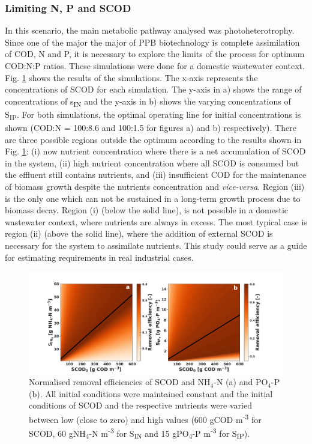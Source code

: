 \subsubsection{Limiting N, P and SCOD}
In this scenario, the main metabolic pathway analysed was photoheterotrophy. Since one of the major the major of PPB biotechnology is complete assimilation of COD, N and P, it is necessary to explore the limits of the process for optimum COD:N:P ratios. These simulations were done for a domestic wastewater context.
\skippingparagraph
Fig. \ref{fig:ch2_cnp} shows the results of the simulations. The x-axis represents the concentrations of SCOD for each simulation. The y-axis in a) shows the range of concentrations of s\textsubscript{IN} and the y-axis in b) shows the varying concentrations of S\textsubscript{IP}. For both simulations, the optimal operating line for initial concentrations is shown (COD:N = 100:8.6 and 100:1.5 for figures a) and b) respectively). There are three possible regions outside the optimum according to the results shown in Fig. \ref{fig:ch2_cnp}: (i) now nutrient concentration where there is a net accumulation of SCOD in the system, (ii) high nutrient concentration where all SCOD is consumed but the effluent still contains nutrients, and (iii) insufficient COD for the maintenance of biomass growth despite the nutrients concentration and \textit{vice-versa}. Region (iii) is the only one which can not be sustained in a long-term growth process due to biomass decay. Region (i) (below the solid line), is not possible in a domestic wastewater context, where nutrients are always in excess. The most typical case is region (ii) (above the solid line), where the addition of external SCOD is necessary for the system to assimilate nutrients. This study could serve as a guide for estimating requirements in real industrial cases.  



\begin{figure}[tp]
    \hspace*{-2cm} 
    \includegraphics[width=1.25\linewidth]{./Chap2/simulations/ch2_sin_cod.pdf}
    \caption{Normalised removal efficiencies of SCOD and $\mathrm{NH_4\mbox{-}N}$ (a) and $\mathrm{PO_4\mbox{-}P}$ (b). All initial conditions were maintained constant and the initial conditions of SCOD and the respective nutrients were varied between low (close to zero) and high values (600 gCOD m\textsuperscript{-3} for SCOD, 60 gNH\textsubscript{4}-N m\textsuperscript{-3} for S\textsubscript{IN} and 15 gPO\textsubscript{4}-P m\textsuperscript{-3} for S\textsubscript{IP}).}
    \label{fig:ch2_cnp}
\end{figure}


